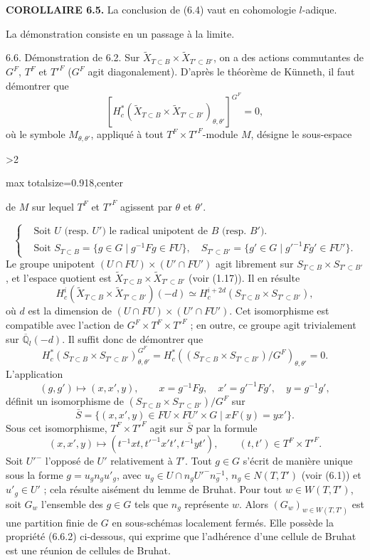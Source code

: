 \documentclass[9pt,twoside]{extarticle}
\newcommand{\EditionPage}[3]{%
  \ifnum#1>2\clearpage\fi
  \pdfbookmark[1]{Printed page #2}{fr-folio-#2}%
  \hypertarget{fr-physical-#1}{}%
  \noindent\begin{adjustbox}{max totalsize={\textwidth}{0.918\textheight},center}
  \begin{minipage}[t]{\textwidth}
  \fontsize{9.4}{11.1}\selectfont\justifying
  #3
  \end{minipage}
  \end{adjustbox}%
}
\begin{document}
{\noindent\textbf{COROLLAIRE 6.5.} La conclusion de (6.4) vaut en cohomologie \(l\)-adique.\par

La démonstration consiste en un passage à la limite.\par

6.6. Démonstration de 6.2. Sur \(\widetilde X_{T\subset B}\times\widetilde X_{T'\subset B'}\), on a des actions commutantes de \(G^F\), \(T^F\) et \(T'^F\) (\(G^F\) agit diagonalement). D'après le théorème de Künneth, il faut démontrer que \[
\left[
H_c^*(\widetilde X_{T\subset B}\times\widetilde X_{T'\subset B'})_{\theta,\theta'}
\right]^{G^F}=0,
\] où le symbole \(M_{\theta,\theta'}\), appliqué à tout \(T^F\times T'^F\)-module \(M\), désigne le sous-espace\par
}

\EditionPage{36}{137}{%
de \(M\) sur lequel \(T^F\) et \(T'^F\) agissent par \(\theta\) et \(\theta'\).\par

\[
\left\{
\begin{aligned}
&\text{Soit }U\text{ (resp. }U'\text{) le radical unipotent de }B\text{ (resp. }B'\text{).}\\
&\text{Soit }S_{T\subset B}=\{g\in G\mid g^{-1}Fg\in FU\},\quad
S_{T'\subset B'}=\{g'\in G\mid g'^{-1}Fg'\in FU'\}.
\end{aligned}
\right.
\] Le groupe unipotent \((U\cap FU)\times(U'\cap FU')\) agit librement sur \(S_{T\subset B}\times S_{T'\subset B'}\), et l'espace quotient est \(\widetilde X_{T\subset B}\times\widetilde X_{T'\subset B'}\) (voir (1.17)). Il en résulte \[
H_c^i(\widetilde X_{T\subset B}\times\widetilde X_{T'\subset B'})(-d)
\simeq
H_c^{i+2d}(S_{T\subset B}\times S_{T'\subset B'}),
\] où \(d\) est la dimension de \((U\cap FU)\times(U'\cap FU')\). Cet isomorphisme est compatible avec l'action de \(G^F\times T^F\times T'^F\) ; en outre, ce groupe agit trivialement sur \(\overline{\mathbb Q}_l(-d)\). Il suffit donc de démontrer que \[
H_c^*(S_{T\subset B}\times S_{T'\subset B'})_{\theta,\theta'}^{G^F}
=
H_c^*((S_{T\subset B}\times S_{T'\subset B'})/G^F)_{\theta,\theta'}
=0.
\] L'application \[
(g,g')\longmapsto(x,x',y),\qquad
x=g^{-1}Fg,\quad x'=g'^{-1}Fg',\quad y=g^{-1}g',
\] définit un isomorphisme de \((S_{T\subset B}\times S_{T'\subset B'})/G^F\) sur \[
\bar S=\{(x,x',y)\in FU\times FU'\times G\mid xF(y)=yx'\}.
\] Sous cet isomorphisme, \(T^F\times T'^F\) agit sur \(\bar S\) par la formule \[
\tag{6.6.1}
(x,x',y)\longmapsto(t^{-1}xt,t'^{-1}x't',t^{-1}yt'),
\qquad(t,t')\in T^F\times T'^F.
\] Soit \(U'^{-}\) l'opposé de \(U'\) relativement à \(T'\). Tout \(g\in G\) s'écrit de manière unique sous la forme \(g=u_gn_gu'_g\), avec \(u_g\in U\cap n_gU'^{-}n_g^{-1}\), \(n_g\in N(T,T')\) (voir (6.1)) et \(u'_g\in U'\) ; cela résulte aisément du lemme de Bruhat. Pour tout \(w\in W(T,T')\), soit \(G_w\) l'ensemble des \(g\in G\) tels que \(n_g\) représente \(w\). Alors \((G_w)_{w\in W(T,T')}\) est une partition finie de \(G\) en sous-schémas localement fermés. Elle possède la propriété (6.6.2) ci-dessous, qui exprime que l'adhérence d'une cellule de Bruhat est une réunion de cellules de Bruhat.\par

}
\end{document}
